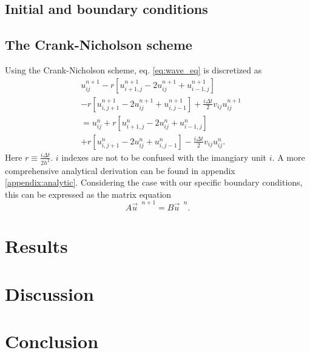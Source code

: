 \documentclass[english,notitlepage,reprint,nofootinbib]{revtex4-1}  %
\begin{document}
\subsection*{Initial and boundary conditions}

\subsection*{The Crank-Nicholson scheme}
Using the Crank-Nicholson scheme, eq. \ref{eq:wave_eq} is discretized as
\begin{align}
    &u_{ij}^{n+1} - r \left[ u_{i+1,j}^{n+1}- 2 u_{ij}^{n+1} + u_{i-1,j}^{n+1} \right] \\
    &- r \left[ u_{i,j+1}^{n+1}- 2 u_{ij}^{n+1} + u_{i,j-1}^{n+1} \right]
    + \frac{i \Delta t}{2} v_{ij} u_{ij}^{n+1} \\
    &= u_{ij}^n 
    + r \left[ u_{i+1,j}^{n}- 2 u_{ij}^{n} + u_{i-1,j}^{n} \right] \\
    &+ r \left[ u_{i,j+1}^{n}- 2 u_{ij}^{n} + u_{i,j-1}^{n} \right]
    - \frac{i \Delta t}{2} v_{ij} u_{ij}^{n}.
\end{align}
Here $r \equiv \frac{i \Delta t}{2h^2}$. $i$ indexes are not to be confused with the imangiary unit $i$. A more comprehensive analytical derivation can be found in appendix \ref{appendix:analytic}. Considering the case with our specific boundary conditions, this can be expressed as the matrix equation
\begin{equation}
    A \vec{u}^{\text{ }n+1} = B \vec{u}^{\text{ }n}.
\end{equation}
\section{Results}\label{sec:results}
%

\section{Discussion}\label{sec:discussion}
%


\section{Conclusion}\label{sec:conclusion}

\onecolumngrid

%

\end{document}
